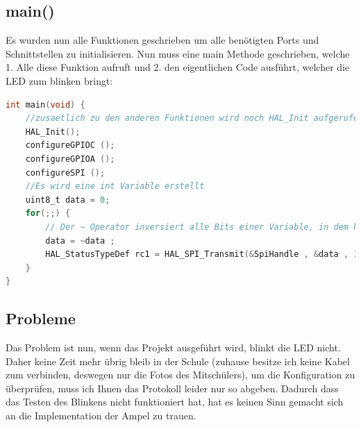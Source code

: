 \clearpage
\subsection{main()}
Es wurden nun alle Funktionen geschrieben um alle benötigten Ports und Schnittstellen zu initialisieren. Nun muss eine main Methode geschrieben, welche 1. Alle diese Funktion aufruft und 2. den eigentlichen Code ausführt, welcher die LED zum blinken bringt:

\begin{lstlisting}[language=C]
int main(void) {
	//zusaetlich zu den anderen Funktionen wird noch HAL_Init aufgerufen um alle Treiber zu starten fuer den HAL driver
	HAL_Init();
	configureGPIOC ();
	configureGPIOA ();
	configureSPI ();
	//Es wird eine int Variable erstellt
	uint8_t data = 0;
	for(;;) {
		// Der ~ Operator inversiert alle Bits einer Variable, in dem konkreten Beispiel wird bei jedem Durchlauf der while-true loop data auf 1 gesetzt wenn es davor 0 war, und auf 0 gesetzt wenn es davor 0 war. Dadurch blinkt die LED alle 5 sekunden auf, weil bei SPI_Transmit ein Delay von 5000ms angegeben wird, zusaetzlich zu den anderen Parameter
		data = ~data ;
		HAL_StatusTypeDef rc1 = HAL_SPI_Transmit(&SpiHandle , &data , 1 , 5000) ;
	}
}
\end{lstlisting}


\subsection{Probleme}
Das Problem ist nun, wenn das Projekt ausgeführt wird, blinkt die LED nicht. Daher keine Zeit mehr übrig bleib in der Schule (zuhause besitze ich keine Kabel zum verbinden, deswegen nur die Fotos des Mitschülers), um die Konfiguration zu überprüfen, muss ich Ihnen das Protokoll leider nur so abgeben. Dadurch dass das Testen des Blinkens nicht funktioniert hat, hat es keinen Sinn gemacht sich an die Implementation der Ampel zu trauen. 